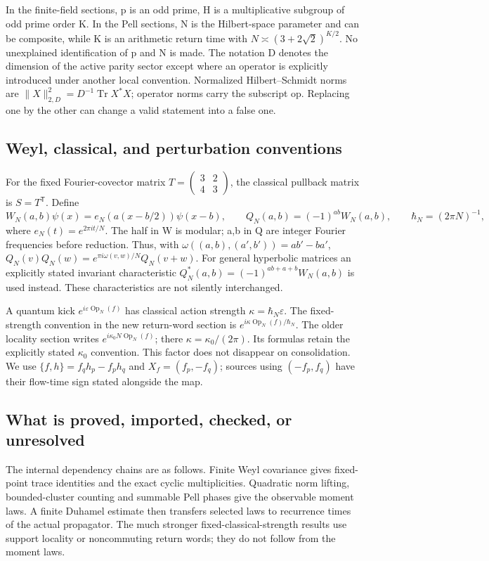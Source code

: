 In the finite-field sections, p is an odd prime, H is a multiplicative
subgroup of odd prime order K. In the Pell sections, N is the Hilbert-space
parameter and can be composite, while K is an arithmetic return time with
$N\asymp(3+2\sqrt2)^{K/2}$. No unexplained identification of p and N is made.
The notation D denotes the dimension of the active parity sector except
where an operator is explicitly introduced under another local convention.
Normalized Hilbert--Schmidt norms are $\|X\|_{2,D}^2=D^{-1}\operatorname{Tr}X^*X$;
operator norms carry the subscript $\mathrm{op}$. Replacing one by the other
can change a valid statement into a false one.

\subsection{Weyl, classical, and perturbation conventions}
For the fixed Fourier-covector matrix
$T=\left(\begin{smallmatrix}3&2\\4&3\end{smallmatrix}\right)$, the
classical pullback matrix is $S=T^{\mathsf T}$. Define
\[
 W_N(a,b)\psi(x)=e_N(a(x-b/2))\psi(x-b),\qquad
 Q_N(a,b)=(-1)^{ab}W_N(a,b),\qquad\hbar_N=(2\pi N)^{-1},
\]
where $e_N(t)=e^{2\pi i t/N}$.
The half in W is modular; a,b in Q are integer Fourier frequencies before
reduction. Thus, with $\omega((a,b),(a',b'))=ab'-ba'$,
$Q_N(v)Q_N(w)=e^{\pi i\omega(v,w)/N}Q_N(v+w)$.
For general hyperbolic matrices an explicitly stated invariant characteristic
$Q_N^*(a,b)=(-1)^{ab+a+b}W_N(a,b)$ is used instead.
These characteristics are not silently interchanged.

A quantum kick $e^{i\varepsilon\operatorname{Op}_N(f)}$ has classical action
strength $\kappa=\hbar_N\varepsilon$. The fixed-strength convention in the
new return-word section is $e^{i\kappa\operatorname{Op}_N(f)/\hbar_N}$.
The older locality section writes $e^{i\kappa_0N\operatorname{Op}_N(f)}$;
there $\kappa=\kappa_0/(2\pi)$. Its formulas retain the explicitly stated
$\kappa_0$ convention. This factor does not disappear on consolidation.
We use $\{f,h\}=f_qh_p-f_ph_q$ and $X_f=(f_p,-f_q)$; sources using
$(-f_p,f_q)$ have their flow-time sign stated alongside the map.

\subsection{What is proved, imported, checked, or unresolved}
The internal dependency chains are as follows. Finite Weyl covariance gives
fixed-point trace identities and the exact cyclic multiplicities. Quadratic
norm lifting, bounded-cluster counting and summable Pell phases give the
observable moment laws. A finite Duhamel estimate then transfers selected
laws to recurrence times of the actual propagator. The much stronger
fixed-classical-strength results use support locality or noncommuting
return words; they do not follow from the moment laws.

